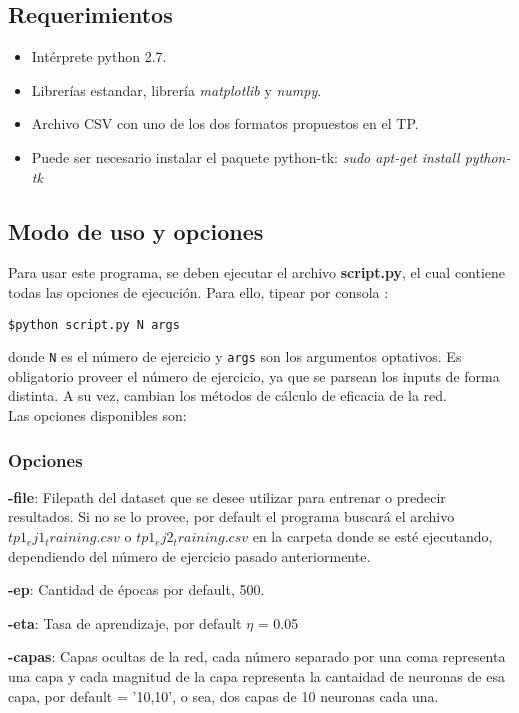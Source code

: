 \subsection{Requerimientos}
\begin{itemize}
\item Intérprete python 2.7.
\item Librerías estandar, librería \textit{matplotlib} y \textit{numpy}.
\item Archivo CSV con uno de los dos formatos propuestos en el TP. 
\item Puede ser necesario instalar el paquete python-tk:
\textit{sudo apt-get install python-tk}
\end{itemize}

\subsection{Modo de uso y opciones}
Para usar este programa, se deben ejecutar el archivo \textbf{script.py}, el cual contiene todas las opciones de ejecución. Para ello, tipear por consola :

\texttt{\$python script.py N args}

donde \texttt{N} es el número de ejercicio y \texttt{args} son los argumentos optativos. Es obligatorio proveer el número de ejercicio, ya que se parsean los inputs de forma distinta. A su vez, cambian los métodos de cálculo de eficacia de la red.\\

Las opciones disponibles son:

\subsubsection{Opciones}

\textbf{-file}: Filepath del dataset que se desee utilizar para entrenar o predecir resultados. Si no se lo provee, por default el programa buscará el archivo $tp1_ej1_training.csv$ o $tp1_ej2_training.csv$ en la carpeta donde se esté ejecutando, dependiendo del número de ejercicio pasado anteriormente.

\textbf{-ep}: Cantidad de épocas por default, 500.

\textbf{-eta}: Tasa de aprendizaje, por default $\eta$ = 0.05

\textbf{-capas}: Capas ocultas de la red, cada número separado por una coma representa una capa y cada magnitud de la capa representa la cantaidad de neuronas de esa capa, por default = '10,10', o sea, dos capas de 10 neuronas cada una.

